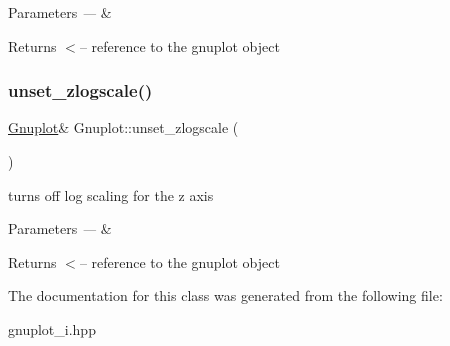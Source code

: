 \begin{DoxyParams}{Parameters}
{\em ---} & \\
\hline
\end{DoxyParams}
\begin{DoxyReturn}{Returns}
$<$-- reference to the gnuplot object 
\end{DoxyReturn}
\mbox{\label{class_gnuplot_afa67f022ca344593b054d7f2e3406c7e}} 
\subsubsection{\texorpdfstring{unset\+\_\+zlogscale()}{unset\_zlogscale()}}
{\footnotesize\ttfamily \mbox{\hyperlink{class_gnuplot}{Gnuplot}}\& Gnuplot\+::unset\+\_\+zlogscale (\begin{DoxyParamCaption}{ }\end{DoxyParamCaption})\hspace{0.3cm}{\ttfamily [inline]}}

turns off log scaling for the z axis


\begin{DoxyParams}{Parameters}
{\em ---} & \\
\hline
\end{DoxyParams}
\begin{DoxyReturn}{Returns}
$<$-- reference to the gnuplot object 
\end{DoxyReturn}


The documentation for this class was generated from the following file\+:\begin{DoxyCompactItemize}
\item 
gnuplot\+\_\+i.\+hpp\end{DoxyCompactItemize}
